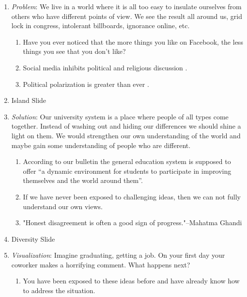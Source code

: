 \documentclass[letterpaper]{article}
\begin{document}
\begin{description}
\begin{enumerate}
  \item
  \emph{Problem}:
  We live in a world where it is all too easy to insulate ourselves from others who have different points of view. We see the result all around us, grid lock in congress, intolerant billboards, ignorance online, etc.
  \begin{enumerate}
    \item
      Have you ever noticed that the more things you like on Facebook, the less things you see that you don't like?
    \item
      Social media inhibits political and religious discussion \cite{silence}.
    \item
      Political polarization is greater than ever \cite{polar}.
  \end{enumerate}
  \renewcommand{\labelenumi}{\emph{Transition}:}
  \item
  Island Slide
  \renewcommand{\labelenumi}{\Roman{enumi}}
  \setcounter{enumi}{1}
  \item
  \emph{Solution}:
  Our university system is a place where people of all types come together. Instead of washing out and hiding our differences we should shine a light on them. We would strengthen our own understanding of the world and maybe gain some understanding of people who are different.
  \begin{enumerate}
    \item
      According to our bulletin the general education system is supposed to offer ``a dynamic environment for students to participate in improving themselves and the world around them''\cite{bulletin}.
    \item
      If we have never been exposed to challenging ideas, then we can not fully understand our own views.
    \item
      "Honest disagreement is often a good sign of progress."--Mahatma Ghandi \cite{ghandi}
  \end{enumerate}
  \renewcommand{\labelenumi}{\emph{Transition}:}
  \item
  Diversity Slide
  \renewcommand{\labelenumi}{\Roman{enumi}}
  \setcounter{enumi}{2}
  \item
  \emph{Visualization}:
  Imagine graduating, getting a job. On your first day your coworker makes a horrifying comment. What happens next?
  \begin{enumerate}
    \item
      You have been exposed to these ideas before and have already know how to address the situation.

\end{enumerate}
\end{enumerate}
\end{description}
\end{document}
